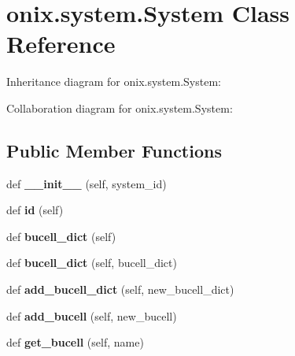 \hypertarget{classonix_1_1system_1_1System}{}\section{onix.\+system.\+System Class Reference}
\label{classonix_1_1system_1_1System}


Inheritance diagram for onix.\+system.\+System\+:


Collaboration diagram for onix.\+system.\+System\+:
\subsection*{Public Member Functions}
\begin{DoxyCompactItemize}
\item 
\mbox{\label{classonix_1_1system_1_1System_abfa90556f5a5a9e4b33a4f0a6a7cdb2d}} 
def {\bfseries \+\_\+\+\_\+init\+\_\+\+\_\+} (self, system\+\_\+id)
\item 
\mbox{\label{classonix_1_1system_1_1System_a07372d376237a1b343e2f6bc05ed9bbc}} 
def {\bfseries id} (self)
\item 
\mbox{\label{classonix_1_1system_1_1System_a45845bee6dd8a7fec62b13de4739ae30}} 
def {\bfseries bucell\+\_\+dict} (self)
\item 
\mbox{\label{classonix_1_1system_1_1System_a43269dbb7b3a3e1bea549b437616dc85}} 
def {\bfseries bucell\+\_\+dict} (self, bucell\+\_\+dict)
\item 
\mbox{\label{classonix_1_1system_1_1System_a2cb55f7c9e7986589206ed799e003e91}} 
def {\bfseries add\+\_\+bucell\+\_\+dict} (self, new\+\_\+bucell\+\_\+dict)
\item 
\mbox{\label{classonix_1_1system_1_1System_afe472ae43da4b1d68288a19d798b4739}} 
def {\bfseries add\+\_\+bucell} (self, new\+\_\+bucell)
\item 
\mbox{\label{classonix_1_1system_1_1System_a28e2f93ff5895f5ec1db5fe17274c1bc}} 
def {\bfseries get\+\_\+bucell} (self, name)

\end{DoxyCompactItemize}
